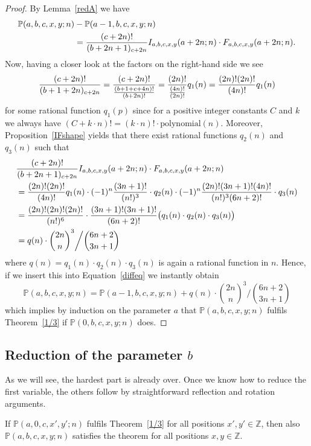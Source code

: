 \documentclass{amsart}
\numberwithin{equation}{section}
\newcommand*{\Z}{\mathbb{Z}}
\begin{document}
\begin{proof}
    By Lemma~\ref{redA} we have
     \begin{align}
        \mathbb{P}(a,b,c,x,y;n)&-\mathbb{P}(a-1,b,c,x,y;n) \label{diffeq}\\
        &=\frac{(c+2n)!}{(b+2n+1)_{c+2n}}I_{a,b,c,x,y}(a+2n;n)\cdot F_{a,b,c,x,y}(a+2n;n).\notag
    \end{align}
    Now, having a closer look at the factors on the right-hand side we see
    \begin{align}
        \frac{(c+2n)!}{(b+1+2n)_{c+2n}}=\frac{(c+2n)!}{\frac{(b+1+c+4n)!}{(b+2n)!}}=\frac{(2n)!}{\frac{(4n)!}{(2n)!}}q_1(n)=\frac{(2n)!(2n)!}{(4n)!}q_1(n)\notag
    \end{align}
    for some rational function $q_1(p)$ since for a positive integer constants $C$ and $k$ we always have $(C+k\cdot n)!=(k\cdot n)!\cdot \text{polynomial}(n)$. Moreover, Proposition~\ref{IFshape} yields that there exist rational functions $q_2(n)$ and $q_3(n)$ such that
    \begin{align}
        &\frac{(c+2n)!}{(b+2n+1)_{c+2n}}I_{a,b,c,x,y}(a+2n;n)\cdot F_{a,b,c,x,y}(a+2n;n)\notag\\
        &=\frac{(2n)!(2n)!}{(4n)!}q_1(n)\cdot (-1)^n\frac{(3n+1)!}{(n!)^3}\cdot q_2(n)\cdot (-1)^n\frac{(2n)!(3n+1)!(4n)!}{(n!)^3(6n+2)!}\cdot q_3(n)\notag\\
        &=\frac{(2n)!(2n)!(2n)!}{(n!)^6}\cdot \frac{(3n+1)!(3n+1)!}{(6n+2)!}\big(q_1(n)\cdot q_2(n)\cdot q_3(n)\big)\notag\\
        &=q(n)\cdot \binom{2n}{n}^3\bigg/\binom{6n+2}{3n+1}\notag
    \end{align}
    where $q(n)=q_1(n)\cdot q_2(n)\cdot q_3(n)$ is again a rational function in $n.$ Hence, if we insert this into Equation~\eqref{diffeq} we instantly obtain
    \[\mathbb{P}(a,b,c,x,y;n)=\mathbb{P}(a-1,b,c,x,y;n)+q(n)\cdot \binom{2n}{n}^3\bigg/\binom{6n+2}{3n+1}\]
    which implies by induction on the parameter $a$ that $\mathbb{P}(a,b,c,x,y;n)$ fulfils Theorem~\ref{1/3} if $\mathbb{P}(0,b,c,x,y;n)$ does.
\end{proof}

\subsection{Reduction of the parameter $b$}
As we will see, the hardest part is already over. Once we know how to reduce the first variable, the others follow by straightforward reflection and rotation arguments.
\begin{thm}\label{pararedB}
    If\/ $\mathbb{P}(a,0,c,x',y';n)$ fulfils Theorem~\ref{1/3} for all positions $x',y'\in \Z$, then also $\mathbb{P}(a,b,c,x,y;n)$ satisfies the theorem for all positions $x,y\in\Z$.
\end{thm}
\end{document}
